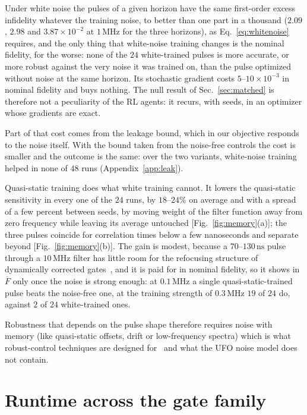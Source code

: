 \documentclass[aps,prx,twocolumn,superscriptaddress,nofootinbib,amsmath,amssymb,floatfix]{revtex4-2}
\newcommand{\Fbar}{\overline{F}}
\newcommand{\ns}{\,\mathrm{ns}}
\newcommand{\MHz}{\,\mathrm{MHz}}
\begin{document}
Under white noise the pulses of a given horizon have the same first-order excess infidelity whatever
the training noise, to better than one part in a thousand ($2.09$, $2.98$ and $3.87\times10^{-2}$ at
$1\MHz$ for the three horizons), as Eq.~\eqref{eq:whitenoise} requires, and the only thing that white-noise training changes is the nominal
fidelity, for the worse: none of the $24$ white-trained pulses is more accurate, or more robust against
the very noise it was trained on, than the pulse optimized without noise at the same horizon. Its
stochastic gradient costs $5$--$10\times10^{-3}$ in nominal fidelity and buys nothing. The null result of
Sec.~\ref{sec:matched} is therefore not a peculiarity of the RL agents: it recurs, with seeds, in an
optimizer whose gradients are exact.

Part of that cost comes from the leakage bound, which in our objective responds to the noise itself. With
the bound taken from the noise-free controls the cost is smaller and the outcome is the same: over the two
variants, white-noise training helped in none of $48$ runs (Appendix~\ref{app:leak}).

Quasi-static training does what white training cannot. It lowers the quasi-static sensitivity in every
one of the $24$ runs, by $18$--$24\%$ on average and with a spread of a few percent between seeds, by
moving weight of the filter function away from zero frequency while leaving its average untouched
[Fig.~\ref{fig:memory}(a)]; the three pulses coincide for correlation times below a few nanoseconds and
separate beyond [Fig.~\ref{fig:memory}(b)]. The gain is modest, because a $70$--$130\ns$ pulse through a
$10\MHz$ filter has little room for the refocusing structure of dynamically corrected
gates~\cite{KhodjastehViola2009}, and it is paid for in nominal fidelity, so it shows in $\Fbar$ only once
the noise is strong enough: at $0.1\MHz$ a single quasi-static-trained pulse beats the noise-free one, at
the training strength of $0.3\MHz$ $19$ of $24$ do, against $2$ of $24$ white-trained ones.

Robustness that depends on the pulse shape therefore requires noise with memory (like quasi-static offsets,
drift or low-frequency spectra) which is what robust-control techniques are designed
for~\cite{Koch2022} and what the UFO noise model does not contain.

\section{Runtime across the gate family}
\label{sec:runtime}
\end{document}
